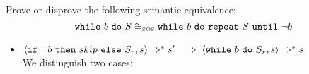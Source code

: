 \begin{exercise}{
    Prove or disprove the following semantic equivalence:
    \[ \texttt{while}\ b\ \texttt{do}\ S \cong_{\text{\tiny SOS}} \texttt{while}\ b\ \texttt{do}\ \texttt{repeat}\ S\ \texttt{until}\ \neg b  \]\vspace*{-0.6cm}
}
\begin{itemize}
\begin{itemize}
\begin{itemize}
                    \item $\Bool{ b} s = \text{tt}$
                    \begin{align*}
                        &\instr{\texttt{if}\ \neg b\ \texttt{then}\ skip\ \texttt{else}\ S_r}{s}
                        \\&\qquad\Rightarrow \instr{S_r}{s}
                        \\&\qquad\Rightarrow \instr{S; \texttt{if}\ \neg b\ \texttt{then}\ skip\ \texttt{else}\ S_r}{s}
                        \\&\qquad\Rightarrow^k s'
                    \end{align*}
                    By the decomposition lemma $\exists k_1, k_2 :$
                    \begin{gather*}
                        k_1 + k_2 = k - 1 \\
                        \instr{S}{s} \Rightarrow^{k_1} s'' \\
                        \instr{\texttt{if}\ \neg b\ \texttt{then}\ skip\ \texttt{else}\ S_r}{s''} \Rightarrow^{k_2} s'
                    \end{gather*}
                    Then
                    \begin{align*}
                        &\instr{\wwhile{b}{S}}{s}
                        \\&\qquad\Rightarrow \instr{\texttt{if}\ b\ \texttt{then} (S; \wwhile{b}{S})\ \texttt{else}\ skip}{s}
                        \\&\qquad\Rightarrow \instr{S; \wwhile{b}{S}}{s}
                        \\&\text{By the composition lemma}
                        \\&\qquad\Rightarrow \instr{\wwhile{b}{S}}{s''}
                    \end{align*}
                    And since $\instr{\texttt{if}\ \neg b\ \texttt{then}\ skip\ \texttt{else}\ S_r}{s''} \Rightarrow^{k_2} s'$ and $k_2 = k - 1 - k_1 \leq k$  we can apply the inductive hypothesis and get
                    \[ \instr{\wwhile{b}{S}}{s''} \Rightarrow s' \]
                \end{itemize}
            \end{itemize}
        \item $\instr{\texttt{if}\ \neg b\ \texttt{then}\ skip\ \texttt{else}\ S_r}{s} \Rightarrow^* s' \implies \instr{\wwhile{b}{S}_r}{s} \Rightarrow^* s$ \\
            We distinguish two cases:

\end{itemize}
\end{exercise}
